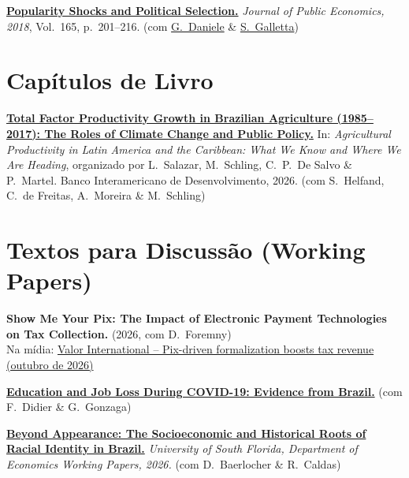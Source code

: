 \documentclass[a4paper,9pt]{article}
\newcommand{\cvgap}{\vspace{2mm}}
\begin{document}
\cvgap

\textbf{\href{https://www.sciencedirect.com/science/article/pii/S0047272718301361}{Popularity Shocks and Political Selection.}} \emph{Journal of Public Economics, 2018}, Vol.~165, p.~201--216. (com \href{http://www.gianmarcodaniele.com/}{G.~Daniele} \& \href{http://sergio-galletta.com/}{S.~Galletta})

\section{Capítulos de Livro}

\textbf{\href{https://doi.org/10.18235/0014396}{Total Factor Productivity Growth in Brazilian Agriculture (1985--2017): The Roles of Climate Change and Public Policy.}} In: \emph{Agricultural Productivity in Latin America and the Caribbean: What We Know and Where We Are Heading}, organizado por L.~Salazar, M.~Schling, C.~P.~De Salvo \& P.~Martel. Banco Interamericano de Desenvolvimento, 2026. (com S.~Helfand, C.~de Freitas, A.~Moreira \& M.~Schling)

\section{Textos para Discussão (Working Papers)}

\textbf{Show Me Your Pix: The Impact of Electronic Payment Technologies on Tax Collection.} (2026, com D.~Foremny) \\
\hspace{2em} Na mídia: \href{https://valorinternational.globo.com/business/news/2026/10/27/pix-driven-formalization-boosts-tax-revenue.ghtml}{Valor International -- Pix-driven formalization boosts tax revenue (outubro de 2026)}

\cvgap

\textbf{\href{https://www.researchgate.net/profile/Francisco-Cavalcanti-6/publication/406502168_Education_and_Job_Loss_During_COVID-19_Evidence_from_Brazil/links/6a29d64a68552924bb0049a2/Education-and-Job-Loss-During-COVID-19-Evidence-from-Brazil.pdf}{Education and Job Loss During COVID-19: Evidence from Brazil.}} (com F.~Didier \& G.~Gonzaga)

\cvgap

\textbf{\href{https://ideas.repec.org/p/usf/wpaper/2026-01.html}{Beyond Appearance: The Socioeconomic and Historical Roots of Racial Identity in Brazil.}} \emph{University of South Florida, Department of Economics Working Papers, 2026.} (com D.~Baerlocher \& R.~Caldas)
\end{document}
